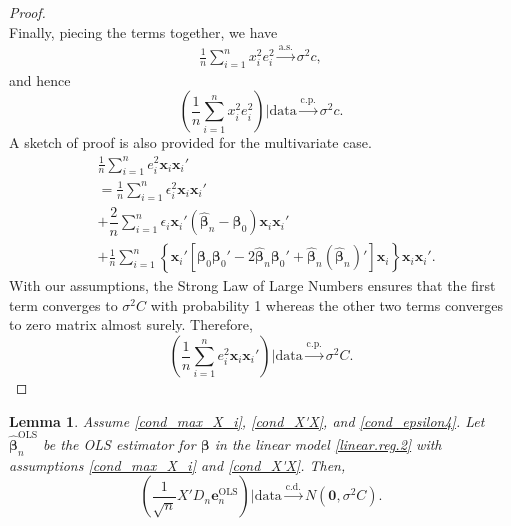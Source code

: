 \documentclass[12pt]{article}
\newcommand{\bhat}{\widehat{\bm{\beta}}_n} %
\newcommand{\bLS}{\widehat{\bm{\beta}}_n^{\text{OLS}}} %
\newcommand{\be}{\bm{\beta}} %
\newcommand{\eLS}{\bm{e}_n^{\text{OLS}}} %
\newcommand{\sumin}{\sum_{i=1}^n} %
\newcommand{\dn}{\frac{1}{n}} %
\newcommand{\dqn}{\frac{1}{\sqrt{n}}} %
\newcommand{\CONV}[1]{\stackrel{\text{#1}}{\longrightarrow}} %
\newcommand{\x}{\bm{x}_i} %
\newtheorem{lem}{Lemma}[section]
\begin{document}
\begin{proof}
$$	$$
	Finally, piecing the terms together, we have
	\begin{align*}
	\dn \sumin x_i^2 e_i^2 \CONV{a.s.} \sigma^2 c,
	\end{align*}
	and hence
	$$
	\left( \dn \sumin x_i^2 e_i^2 \right)
	\bigg| \text{data} 
	\CONV{c.p.} \sigma^2 c.
	$$
	A sketch of proof is also provided for the multivariate case. 
	\begin{align*}
	&\dn \sumin e_i^2 \x \x' \\
	&= \dn \sumin \epsilon_i^2 \x \x' \\
	&+ \dfrac{2}{n} \sumin 
					\epsilon_i \x' 
					\left( \bhat - \be_0 \right)
					\x \x' \\
	&+ \dn \sumin
			\left\{
				\x'\left[
						\be_0 \be_0'
						- 2 \bhat \be_0'
						+ \bhat \left( \bhat \right)' 
				\right] \x 
			\right\} \x \x'.
	\end{align*} 
	With our assumptions, the Strong Law of Large Numbers ensures that the first term converges to $\sigma^2 C$ with probability 1 whereas the other two terms converges to zero matrix almost surely. Therefore,
	 $$
	 \left( \dn \sumin e_i^2 \x \x' \right)
	 \bigg| \text{data} 
	 \CONV{c.p.} \sigma^2 C.
	 $$
\end{proof}

\begin{lem} \label{lem_X'Dne_normal}
Assume \eqref{cond_max_X_i}, \eqref{cond_X'X}, and \eqref{cond_epsilon4}. Let $\bLS$ be the OLS estimator for $\be$ in the linear model \eqref{linear.reg.2} with assumptions \eqref{cond_max_X_i} and \eqref{cond_X'X}. Then,
	$$
	\left( 
		\dqn X' D_n \eLS 
	\right) \bigg| \text{data}
	\CONV{c.d.} 
	N \left( \bm{0}, \sigma^2 C \right).
	$$
\end{lem} 
\end{document}
